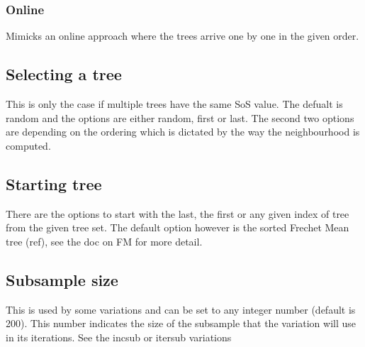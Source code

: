 \documentclass[letterpaper,10pt,english]{sphinxmanual}
\begin{document}
\begin{sphinxVerbatim}[commandchars=\\\{\}]
\end{sphinxVerbatim}


\subsubsection{Online}
\label{\detokenize{summary:online}}\label{\detokenize{summary:var-online}}
\sphinxAtStartPar
Mimicks an online approach where the trees arrive one by one in the given order.

\begin{sphinxVerbatim}[commandchars=\\\{\}]
\end{sphinxVerbatim}


\subsection{Selecting a tree}
\label{\detokenize{summary:selecting-a-tree}}
\sphinxAtStartPar
This is only the case if multiple trees have the same SoS value.
The defualt is random and the options are either random, first or last.
The second two options are depending on the ordering which is dictated by the way the neighbourhood
is computed.


\subsection{Starting tree}
\label{\detokenize{summary:starting-tree}}
\sphinxAtStartPar
There are the options to start with the last, the first or any given index of tree from the given tree set.
The default option however is the sorted Frechet Mean tree (ref), see the doc on FM for more detail.


\subsection{Subsample size}
\label{\detokenize{summary:subsample-size}}
\sphinxAtStartPar
This is used by some variations and can be set to any integer number (default is 200).
This number indicates the size of the subsample that the variation will use in its iterations.
See the incsub or itersub variations
\end{document}
